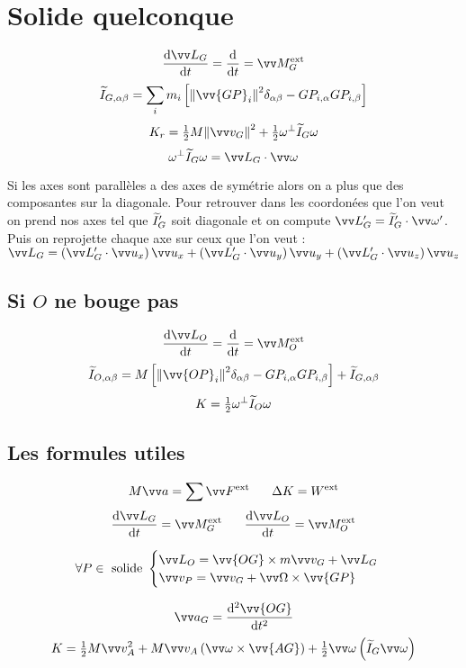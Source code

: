\documentclass[../main.tex]{subfiles}
\begin{document}
\section{Solide quelconque}
\[
  \dv{\mc_G}{t}=\dv{}{t}(\widetilde{I}_G\vian)=\mf_G^{\exte}
\]
\[
  \ti_{G,\alpha\beta}=\sum_im_i\left[\norm{\vv{GP}_i}^2\delta_{\alpha\beta} - GP_{i,\alpha}GP_{i,\beta}\right]
\]
\[
  K_r = \tfrac{1}{2}M\norm{\vi_G}^2 + \tfrac{1}{2}\omega^{\bot}\ti_G\omega
\]
\[
  \omega^{\bot}\ti_G\omega=\mc_G\cdot\vian
\]

Si les axes sont parallèles a des axes de symétrie alors on a plus que des composantes sur la diagonale. Pour retrouver dans les coordonées que l'on veut on prend nos axes tel que \(\widetilde{I}_G'\) soit diagonale et on compute \(\mc_G'=\ti_G'\cdot\vian'\). Puis on reprojette chaque axe sur ceux que l'on veut : \(\mc_G=\left(\mc_G'\cdot\ux\right)\ux + \left(\mc_G'\cdot\uy\right)\uy + \left(\mc_G'\cdot\uz\right)\uz\)

\subsection{Si \(O\) ne bouge pas}
\[
  \dv{\mc_O}{t}=\dv{}{t}(\widetilde{I}_O\vian)=\mf_O^{\exte}
\]
\[
  \ti_{O,\alpha\beta}=M\left[\norm{\vv{OP}_i}^2\delta_{\alpha\beta} - GP_{i,\alpha}GP_{i,\beta}\right] + \ti_{G,\alpha\beta}
\]
\[
  K =\tfrac{1}{2}\omega^{\bot}\widetilde{I}_O\omega
\]
\subsection{Les formules utiles}
\[
  M\ac = \sum\F^{\exte} \phantom{text} \Delta K = W^{\exte}
\]
\[
  \dv{\mc_G}{t}=\mf_G^{\exte} \phantom{text} \dv{\mc_O}{t}=\mf_O^{\exte}
\]

\[ \forall P\in \text{ solide } 
  \begin{cases}
    \mc_O = \vv{OG}\times m\vi_G + \mc_G \\
    \vi_P = \vi_G + \Vian\times\vv{GP}
  \end{cases}
\]

\[
  \ac_G = \dv[2]{\vv{OG}}{t}
\]
\[
  K = \tfrac{1}{2}M\vi_A^2 + M\vi_A\left(\vian\times\vv{AG}\right) + \tfrac{1}{2}\vian\left(\ti_G\vian\right)
\]
\end{document}
